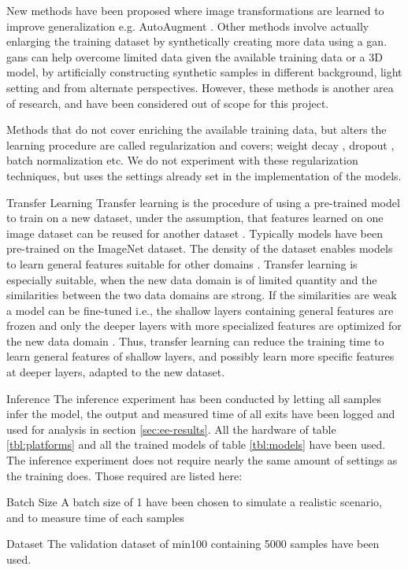 \begin{enumdescript}
\begin{enumdescript}
		New methods have been proposed where image transformations are learned to improve generalization e.g. AutoAugment \cite{cubuk_autoaugment:_2018}. Other methods involve actually enlarging the training dataset by synthetically creating more data using a \gls{gan}. \gls{gan}s can help overcome limited data given the available training data or a 3D model, by artificially constructing synthetic samples in different background, light setting and from alternate perspectives. However, these methods is another area of research, and have been considered out of scope for this project.
		
		Methods that do not cover enriching the available training data, but alters the learning procedure are called regularization and covers; weight decay \cite{krogh_simple_nodate}, dropout \cite{srivastava_dropout:_nodate}, batch normalization \cite{ioffe_batch_2015} etc. We do not experiment with these regularization techniques, but uses the settings already set in the implementation of the models.
		
		\item[Transfer Learning] Transfer learning is the procedure of using a pre-trained model to train on a new dataset, under the assumption, that features learned on one image dataset can be reused for another dataset \cite{yosinski_how_2014}. Typically models have been pre-trained on the ImageNet dataset. The density of the dataset enables models to learn general features suitable for other domains \cite{kornblith_better_2019}. Transfer learning is especially suitable, when the new data domain is of limited quantity and the similarities between the two data domains are strong. If the similarities are weak a model can be fine-tuned i.e., the shallow layers containing general features are frozen and only the deeper layers with more specialized features are optimized for the new data domain \cite{li_cs231n:_2018}. Thus, transfer learning can reduce the training time to learn general features of shallow layers, and possibly learn more specific features at deeper layers, adapted to the new dataset.
	\end{enumdescript}
	
	\item[Inference] The inference experiment has been conducted by letting all samples infer the model, the output and measured time of all exits have been logged and used for analysis in section \ref{sec:ee-results}. All the hardware of table \ref{tbl:platforms} and all the trained models of table \ref{tbl:models} have been used. The inference experiment does not require nearly the same amount of settings as the training does. Those required are listed here:
	\begin{enumdescript}
		\item[Batch Size] A batch size of 1 have been chosen to simulate a realistic scenario, and to measure time of each samples
		\item[Dataset] The validation dataset of \gls{min100} containing 5000 samples have been used.
	\end{enumdescript} 
	
\end{enumdescript}

